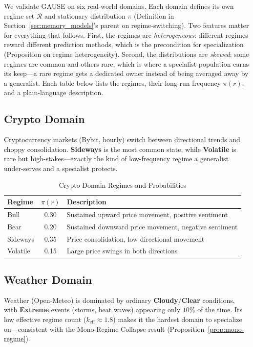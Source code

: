 \documentclass[11pt,a4paper]{article}
\theoremstyle{definition}
\theoremstyle{plain}
\begin{document}
We validate GAUSE on six real-world domains. Each domain defines its own regime
set $\mathcal{R}$ and stationary distribution $\pi$ (Definition in
Section~\ref{sec:memory_models}'s parent on regime-switching). Two features matter
for everything that follows. First, the regimes are \emph{heterogeneous}:
different regimes reward different prediction methods, which is the precondition
for specialization (Proposition on regime heterogeneity). Second, the
distributions are \emph{skewed}: some regimes are common and others rare, which is
where a specialist population earns its keep---a rare regime gets a dedicated
owner instead of being averaged away by a generalist. Each table below lists the
regimes, their long-run frequency $\pi(r)$, and a plain-language description.

\subsection{Crypto Domain}

Cryptocurrency markets (Bybit, hourly) switch between directional trends and
choppy consolidation. \textbf{Sideways} is the most common state, while
\textbf{Volatile} is rare but high-stakes---exactly the kind of low-frequency
regime a generalist under-serves and a specialist protects.

\begin{table}[H]
\centering
\caption{Crypto Domain Regimes and Probabilities}
\begin{tabular}{lcp{8cm}}
\toprule
Regime & $\pi(r)$ & Description \\
\midrule
Bull & 0.30 & Sustained upward price movement, positive sentiment \\
Bear & 0.20 & Sustained downward price movement, negative sentiment \\
Sideways & 0.35 & Price consolidation, low directional movement \\
Volatile & 0.15 & Large price swings in both directions \\
\bottomrule
\end{tabular}
\end{table}

\subsection{Weather Domain}

Weather (Open-Meteo) is dominated by ordinary \textbf{Cloudy}/\textbf{Clear}
conditions, with \textbf{Extreme} events (storms, heat waves) appearing only
$10\%$ of the time. Its low effective regime count ($k_{\text{eff}} \approx 1.8$)
makes it the hardest domain to specialize on---consistent with the Mono-Regime
Collapse result (Proposition~\ref{prop:mono-regime}).
\end{document}
